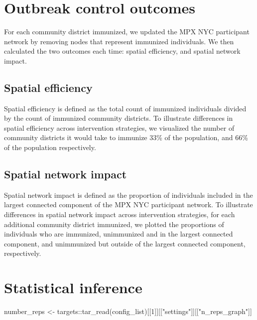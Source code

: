 \documentclass[
  letterpaper,
  DIV=11,
  numbers=noendperiod,
  oneside]{scrreprt}
\newenvironment{Shaded}{\begin{snugshade}}{\end{snugshade}}
\newcommand{\DecValTok}[1]{\textcolor[rgb]{0.68,0.00,0.00}{#1}}
\newcommand{\FunctionTok}[1]{\textcolor[rgb]{0.28,0.35,0.67}{#1}}
\newcommand{\NormalTok}[1]{\textcolor[rgb]{0.00,0.23,0.31}{#1}}
\newcommand{\OtherTok}[1]{\textcolor[rgb]{0.00,0.23,0.31}{#1}}
\newcommand{\SpecialCharTok}[1]{\textcolor[rgb]{0.37,0.37,0.37}{#1}}
\newcommand{\StringTok}[1]{\textcolor[rgb]{0.13,0.47,0.30}{#1}}
\begin{document}
\hypertarget{outbreak-control-outcomes}{%
\section{Outbreak control outcomes}\label{outbreak-control-outcomes}}

For each community district immunized, we updated the MPX NYC
participant network by removing nodes that represent immunized
individuals. We then calculated the two outcomes each time: spatial
efficiency, and spatial network impact.

\hypertarget{spatial-efficiency}{%
\subsection{Spatial efficiency}\label{spatial-efficiency}}

Spatial efficiency is defined as the total count of immunized
individuals divided by the count of immunized community districts. To
illustrate differences in spatial efficiency across intervention
strategies, we visualized the number of community districts it would
take to immunize 33\% of the population, and 66\% of the population
respectively.

\hypertarget{spatial-network-impact}{%
\subsection{Spatial network impact}\label{spatial-network-impact}}

Spatial network impact is defined as the proportion of individuals
included in the largest connected component of the MPX NYC participant
network. To illustrate differences in spatial network impact across
intervention strategies, for each additional community district
immunized, we plotted the proportions of individuals who are immunized,
unimmunized and in the largest connected component, and unimmunized but
outside of the largest connected component, respectively.

\hypertarget{statistical-inference}{%
\section{Statistical inference}\label{statistical-inference}}

\begin{Shaded}
\begin{Highlighting}[]
\NormalTok{number\_reps }\OtherTok{\textless{}{-}}\NormalTok{ targets}\SpecialCharTok{::}\FunctionTok{tar\_read}\NormalTok{(config\_list)[[}\DecValTok{1}\NormalTok{]][[}\StringTok{"settings"}\NormalTok{]][[}\StringTok{"n\_reps\_graph"}\NormalTok{]]}
\end{Highlighting}
\end{Shaded}
\end{document}
